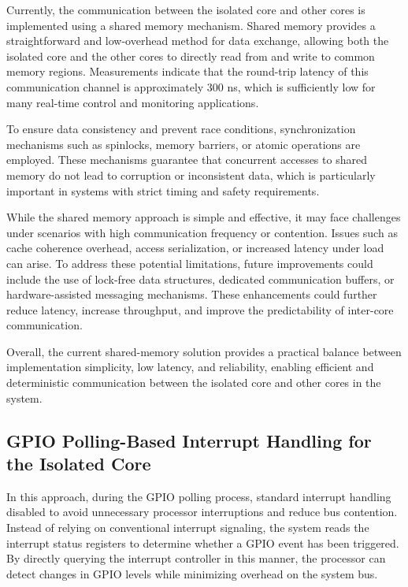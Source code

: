 \documentclass[letterpaper]{article}
\begin{document}
Currently, the communication between the isolated core and other cores is implemented using
a shared memory mechanism. Shared memory provides a straightforward and low-overhead method for
data exchange, allowing both the isolated core and the other cores to directly read from and
write to common memory regions. Measurements indicate that the round-trip latency of this
communication channel is approximately 300 ns, which is sufficiently low for many real-time control and monitoring applications.

To ensure data consistency and prevent race conditions, synchronization mechanisms such as
spinlocks, memory barriers, or atomic operations are employed. These mechanisms guarantee that
concurrent accesses to shared memory do not lead to corruption or inconsistent data, which is
particularly important in systems with strict timing and safety requirements.

While the shared memory approach is simple and effective, it may face challenges under scenarios
with high communication frequency or contention. Issues such as cache coherence overhead, access
serialization, or increased latency under load can arise. To address these potential limitations,
future improvements could include the use of lock-free data structures, dedicated communication
buffers, or hardware-assisted messaging mechanisms. These enhancements could further reduce latency,
increase throughput, and improve the predictability of inter-core communication.

Overall, the current shared-memory solution provides a practical balance between implementation
simplicity, low latency, and reliability, enabling efficient and deterministic communication
between the isolated core and other cores in the system.

\subsection{GPIO Polling-Based Interrupt Handling for the Isolated Core}

In this approach, during the GPIO polling process, standard interrupt handling disabled to
avoid unnecessary processor interruptions and reduce bus contention. Instead of relying on
conventional interrupt signaling, the system reads the interrupt status registers to determine
whether a GPIO event has been triggered. By directly querying the interrupt controller in this
manner, the processor can detect changes in GPIO levels while minimizing overhead on the system bus.
\end{document}
